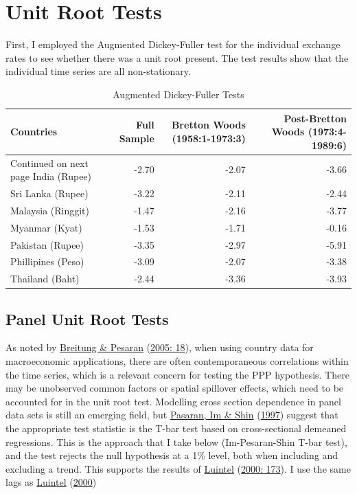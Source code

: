 \documentclass[11pt,preprint, authoryear]{elsarticle}
\numberwithin{equation}{section}
\numberwithin{figure}{section}
\numberwithin{table}{section}
\begin{document}
\hypertarget{unit-root-tests}{%
\section{\texorpdfstring{Unit Root Tests
\label{Unit}}{Unit Root Tests }}\label{unit-root-tests}}

First, I employed the Augmented Dickey-Fuller test for the individual
exchange rates to see whether there was a unit root present. The test
results show that the individual time series are all non-stationary.

\begingroup\fontsize{11pt}{12pt}\selectfont
\begin{longtable}{lrrr}
\caption{Augmented Dickey-Fuller Tests} \\ 
  \toprule
Countries & Full Sample & Bretton Woods (1958:1-1973:3) & Post-Bretton Woods (1973:4-1989:6) \\ 
  \hline 
\endhead 
\hline 
{\footnotesize Continued on next page} 
\endfoot 
\endlastfoot 
 \midrule
India (Rupee) & -2.70 & -2.07 & -3.66 \\ 
  Sri Lanka (Rupee) & -3.22 & -2.11 & -2.44 \\ 
  Malaysia (Ringgit) & -1.47 & -2.16 & -3.77 \\ 
  Myanmar (Kyat) & -1.53 & -1.71 & -0.16 \\ 
  Pakistan (Rupee) & -3.35 & -2.97 & -5.91 \\ 
  Phillipines (Peso) & -3.09 & -2.07 & -3.38 \\ 
  Thailand (Baht) & -2.44 & -3.36 & -3.93 \\ 
   \bottomrule
\end{longtable}
\endgroup

\hypertarget{panel-unit-root-tests}{%
\subsection{Panel Unit Root Tests}\label{panel-unit-root-tests}}

As noted by \protect\hyperlink{ref-pes}{Breitung \& Pesaran}
(\protect\hyperlink{ref-pes}{2005: 18}), when using country data for
macroeconomic applications, there are often contemporaneous correlations
within the time series, which is a relevant concern for testing the PPP
hypothesis. There may be unobserved common factors or spatial spillover
effects, which need to be accounted for in the unit root test. Modelling
cross section dependence in panel data sets is still an emerging field,
but \protect\hyperlink{ref-im}{Pasaran, Im \& Shin}
(\protect\hyperlink{ref-im}{1997}) suggest that the appropriate test
statistic is the T-bar test based on cross-sectional demeaned
regressions. This is the approach that I take below (Im-Pesaran-Shin
T-bar test), and the test rejects the null hypothesis at a 1\% level,
both when including and excluding a trend. This supports the results of
\protect\hyperlink{ref-Kul}{Luintel} (\protect\hyperlink{ref-Kul}{2000:
173}). I use the same lags as \protect\hyperlink{ref-Kul}{Luintel}
(\protect\hyperlink{ref-Kul}{2000})
\end{document}

